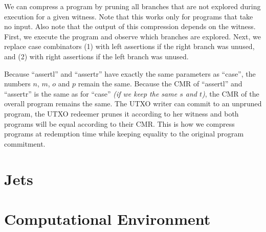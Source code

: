 We can compress a program by pruning all branches that are not explored during execution for a given witness.
Note that this works only for programs that take no input.
Also note that the output of this compression depends on the witness.
First,
we execute the program and observe which branches are explored.
Next,
we replace case combinators
(1) with left assertions if the right branch was unused, and
(2) with right assertions if the left branch was unused.

Because \enquote{assertl} and \enquote{assertr} have exactly the same parameters as \enquote{case},
the numbers $n$, $m$, $o$ and $p$ remain the same.
Because the CMR of \enquote{assertl} and \enquote{assertr} is the same as for \enquote{case}
\emph{(if we keep the same $s$ and $t$)}, the CMR of the overall program remains the same.
The UTXO writer can commit to an unpruned program,
the UTXO redeemer prunes it according to her witness
and both programs will be equal according to their CMR.
This is how we compress programs at redemption time while keeping equality to the original program commitment.

%
%
%

\section{Jets}%
\label{sec:jets}


\section{Computational Environment}%
\label{sec:environment}



